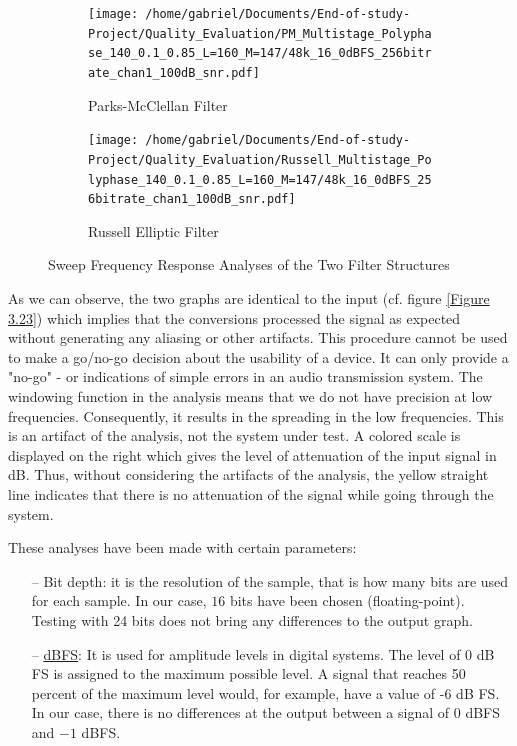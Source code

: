 \begin{figure}[ht]
	\begin{subfigure}[b]{0.5\textwidth}
		\texttt{[image: /home/gabriel/Documents/End-of-study-Project/Quality\_Evaluation/PM\_Multistage\_Polyphase\_140\_0.1\_0.85\_L=160\_M=147/48k\_16\_0dBFS\_256bitrate\_chan1\_100dB\_snr.pdf]}
		\caption{Parks-McClellan Filter}
		
	\end{subfigure}
	\hfill
	\begin{subfigure}[b]{0.5\textwidth}
		\texttt{[image: /home/gabriel/Documents/End-of-study-Project/Quality\_Evaluation/Russell\_Multistage\_Polyphase\_140\_0.1\_0.85\_L=160\_M=147/48k\_16\_0dBFS\_256bitrate\_chan1\_100dB\_snr.pdf]}
		\caption{Russell Elliptic Filter}
		
	\end{subfigure}
	\captionsetup{width=0.95\linewidth}
	\caption{Sweep Frequency Response Analyses of the Two Filter Structures}\label{Figure 3.24}
\end{figure}

As we can observe, the two graphs are identical to the input (cf. figure \ref{Figure 3.23}) which implies that the conversions processed the signal as expected without generating any aliasing or other artifacts. This procedure cannot be used to make a go/no-go
 decision about the usability of a device. It can only provide a "no-go" - or indications of simple errors in an audio transmission system. The windowing function in the analysis means that we do not have precision at low frequencies. Consequently, it results in the spreading in the low frequencies. This is an artifact of the analysis, not the system under test. A colored scale is displayed on the right which gives the level of attenuation of the input signal in \si{dB}. Thus, without considering the artifacts of the analysis, the yellow straight line indicates that there is no attenuation of the signal while going through the system. 
 

These analyses have been made with certain parameters:
\begin{itemize}
	\item[--] Bit depth: it is the resolution of the sample, that is how many bits are used for each sample. In our case, $16$ bits have been chosen (floating-point). Testing with 24 bits does not bring any differences to the output graph.
	\item[--] \hyperlink{dB FS}{dBFS}: It is used for amplitude levels in digital systems. The level of 0 dB FS is assigned to the maximum possible level. A signal that reaches 50 percent of the maximum level would, for example, have a value of -6 dB FS. In our case, there is no differences at the output between a signal of 0 dBFS and $-1$ dBFS.
\end{itemize}

